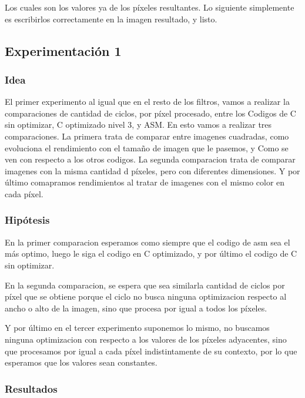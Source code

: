 \par{Los cuales son los valores ya de los píxeles resultantes. Lo siguiente simplemente es escribirlos correctamente en la imagen resultado, y listo.}



	
\subsection{Experimentación 1}

\subsubsection{Idea}
\par{El primer experimento al igual que en el resto de los filtros, vamos a realizar la comparaciones de cantidad de ciclos, por píxel procesado,  entre los Codigos de C sin optimizar, C optimizado nivel 3, y ASM. En esto vamos a realizar tres comparaciones. La primera trata de comparar entre imagenes cuadradas, como evoluciona el rendimiento con el tamaño de imagen que le pasemos, y Como se ven con respecto a los otros codigos. La segunda comparacion trata de comparar imagenes con la misma cantidad d píxeles, pero con diferentes dimensiones. Y por último comapramos rendimientos al tratar de imagenes con el mismo color en cada píxel.}
	
	
\subsubsection{Hipótesis}
\par{En la primer comparacion esperamos como siempre que el codigo de asm sea el más optimo, luego le siga el codigo en C optimizado, y por último el codigo de C sin optimizar.}
\par{En la segunda comparacion, se espera que sea similarla cantidad de ciclos por píxel que se obtiene porque el ciclo no busca ninguna optimizacion respecto al ancho o alto de la imagen, sino que procesa por igual a todos los píxeles.}
\par{Y por último en el tercer experimento suponemos lo mismo, no buscamos ninguna optimizacion con respecto a los valores de los píxeles adyacentes, sino que procesamos por igual a cada píxel indistintamente de su contexto, por lo que esperamos que los valores sean constantes.}

\subsubsection{Resultados}

